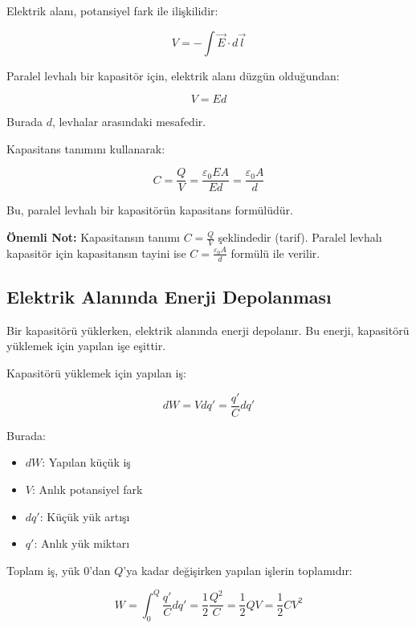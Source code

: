 \documentclass[12pt,a4paper]{fenbil}
\begin{document}
Elektrik alanı, potansiyel fark ile ilişkilidir:

\begin{equation}
V = -\int \vec{E} \cdot d\vec{l}
\end{equation}

Paralel levhalı bir kapasitör için, elektrik alanı düzgün olduğundan:

\begin{equation}
V = Ed
\end{equation}

Burada $d$, levhalar arasındaki mesafedir.

Kapasitans tanımını kullanarak:

\begin{equation}
C = \frac{Q}{V} = \frac{\varepsilon_0 E A}{Ed} = \frac{\varepsilon_0 A}{d}
\end{equation}

Bu, paralel levhalı bir kapasitörün kapasitans formülüdür.

\textbf{Önemli Not:} Kapasitansın tanımı $C = \frac{Q}{V}$ şeklindedir (tarif). Paralel levhalı kapasitör için kapasitansın tayini ise $C = \frac{\varepsilon_0 A}{d}$ formülü ile verilir.

\subsection{Elektrik Alanında Enerji Depolanması}

Bir kapasitörü yüklerken, elektrik alanında enerji depolanır. Bu enerji, kapasitörü yüklemek için yapılan işe eşittir.

Kapasitörü yüklemek için yapılan iş:

\begin{equation}
dW = V dq' = \frac{q'}{C} dq'
\end{equation}

Burada:
\begin{itemize}
    \item $dW$: Yapılan küçük iş
    \item $V$: Anlık potansiyel fark
    \item $dq'$: Küçük yük artışı
    \item $q'$: Anlık yük miktarı
\end{itemize}

Toplam iş, yük 0'dan $Q$'ya kadar değişirken yapılan işlerin toplamıdır:

\begin{equation}
W = \int_0^Q \frac{q'}{C} dq' = \frac{1}{2} \frac{Q^2}{C} = \frac{1}{2} QV = \frac{1}{2} CV^2
\end{equation}
\end{document}
